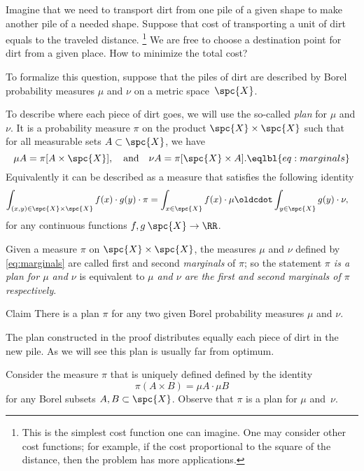 Imagine that we need to transport dirt from one pile of a given shape to make another pile of a needed shape.
Suppose that cost of transporting a unit of dirt equals to the traveled distance.%
\footnote{This is the simplest cost function one can imagine.
One may consider other cost functions; for example, if the cost proportional to the square of the distance, then the problem has more applications.}
We are free to choose a destination point for dirt from a given place.
How to minimize the total cost?

To formalize this question,
suppose that the piles of dirt are described by Borel probability measures $\mu$ and $\nu$ on a metric space~$\spc{X}$.

To describe where each piece of dirt goes, we will use the so-called \emph{plan} for $\mu$ and $\nu$.
It is a probability measure $\pi$ on the product $\spc{X}\times\spc{X}$ such that 
for all measurable sets $A \subset \spc{X}$, we have 
\[\mu A= \pi [A \times \spc{X}],
\quad\text{and}\quad
\nu A=\pi [\spc{X}\times A].
\eqlbl{eq:marginals}\]
Equivalently it can be described as a measure that satisfies the following identity
\begin{align*}
\int_{(x,y)\in \spc{X}\times\spc{X}}f(x)\cdot g(y) \cdot \pi
&=
\int_{x\in \spc{X}}f(x)\cdot \mu
\oldcdot \int_{y\in \spc{X}}g(y)\cdot \nu,
\end{align*}
for any continuous functions $f,g\:\spc{X}\to \RR$.

Given a measure $\pi$ on $\spc{X}\times\spc{X}$, the measures $\mu$ and $\nu$ defined by \ref{eq:marginals} are called first and second \emph{marginals} of $\pi$;
so the statement \textit{$\pi$ is a plan for $\mu$ and $\nu$} is equivalent to \textit{$\mu$ and $\nu$ are the first and second marginals of $\pi$ respectively}.

\begin{thm}{Claim}\label{clm:plan-exists}
There is a plan $\pi$ for any two given Borel probability measures $\mu$ and $\nu$.
\end{thm}

The plan constructed in the proof distributes equally each piece of dirt in the new pile.
As we will see this plan is usually far from optimum.

Consider the measure $\pi$ that is uniquely defined  defined by the identity
\[\pi(A\times B)=\mu A\cdot \mu B\]
for any Borel subsets $A,B\subset\spc{X}$.
Observe that $\pi$ is a plan for $\mu$ and~$\nu$.
\qeds

